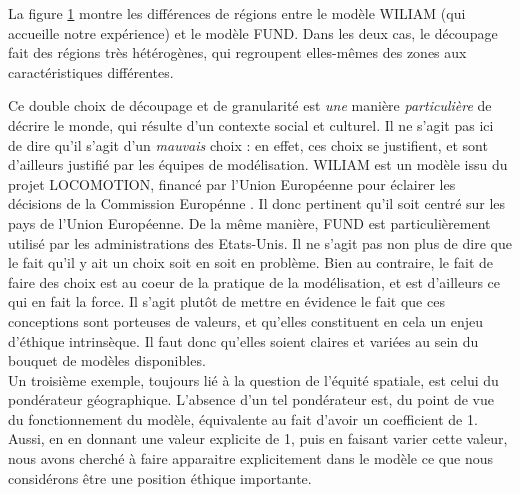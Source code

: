 \begin{figure}[htbp]
    \label{fig:trois_cartes}
\end{figure} 

La figure \ref{fig:trois_cartes} montre les différences de régions entre le modèle WILIAM (qui accueille notre expérience) et le modèle FUND. Dans les deux cas, le découpage fait des régions très hétérogènes, qui regroupent elles-mêmes des zones aux caractéristiques différentes. 

Ce double choix de découpage et de granularité est \emph{une} manière \emph{particulière} de décrire le monde, qui résulte d'un contexte social et culturel. Il ne s'agit pas ici de dire qu'il s'agit d'un \emph{mauvais} choix : en effet, ces choix se justifient, et sont d'ailleurs justifié par les équipes de modélisation. WILIAM est un modèle issu du projet LOCOMOTION, financé par l'Union Européenne pour éclairer les décisions de la Commission Europénne \autocite{locomotion-h2020_locomotion-h2020wiliam_model_vensim_2024}. Il donc pertinent qu'il soit centré sur les pays de l'Union Européenne. De la même manière, FUND est particulièrement utilisé par les administrations des Etats-Unis. Il ne s'agit pas non plus de dire que le fait qu'il y ait un choix soit en soit en problème. Bien au contraire, le fait de faire des choix est au coeur de la pratique de la modélisation, et est d'ailleurs ce qui en fait la force. Il s'agit plutôt de mettre en évidence le fait que ces conceptions sont porteuses de valeurs, et qu'elles constituent en cela un enjeu d'éthique intrinsèque. Il faut donc qu'elles soient claires et variées au sein du bouquet de modèles disponibles.  \\

Un troisième exemple, toujours lié à la question de l'équité spatiale, est celui du pondérateur géographique. L'absence d'un tel pondérateur est, du point de vue du fonctionnement du modèle, équivalente au fait d'avoir un coefficient de 1. Aussi, en en donnant une valeur explicite de 1, puis en faisant varier cette valeur, nous avons cherché à faire apparaitre explicitement dans le modèle ce que nous considérons être une position éthique importante.  \\

